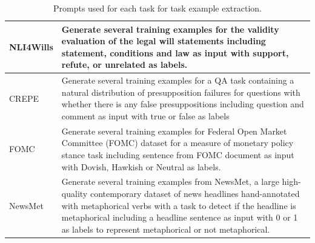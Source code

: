 \documentclass[letterpaper]{article} %
\begin{document}
\begin{table}[h!]
\begin{tabular}{l|p{5.5in}}
NLI4Wills &
  Generate several training examples for the validity evaluation of the legal will statements including statement,  conditions and law as input with support, refute, or unrelated as labels.  \\ \hline
CREPE &
  Generate several training examples for a QA task containing a natural distribution of presupposition failures for questions with whether there is any false presuppositions including question and comment as input with true or false as labels  \\ \hline
FOMC &
  Generate several training examples for Federal Open Market Committee (FOMC) dataset for a measure of monetary policy stance task including sentence from FOMC document as input with Dovish, Hawkish or Neutral as labels.  \\ \hline
NewsMet &
  Generate several training examples from NewsMet, a large high-quality contemporary dataset of news headlines hand-annotated with metaphorical verbs with a task to detect if the headline is metaphorical including a headline  sentence as input with 0 or 1 as labels to represent metaphorical or not metaphorical.  \\ \hline
\end{tabular}
\caption{Prompts used for each task for task example extraction.}
\label{tab:task-extraction-prompts}
\end{table}
\end{document}
